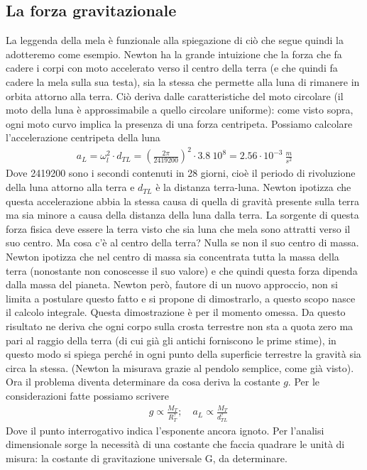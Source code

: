 \documentclass[10pt,a4paper]{article}
\begin{document}
\subsection{La forza gravitazionale}
La leggenda della mela è funzionale alla spiegazione di ciò che segue quindi la adotteremo come esempio. Newton ha la grande intuizione che la forza che fa cadere i corpi con moto accelerato verso il centro della terra (e che quindi fa cadere la mela sulla sua testa), sia la stessa che permette alla luna di rimanere in orbita attorno alla terra. Ciò deriva dalle caratteristiche del moto circolare (il moto della luna è approssimabile a quello circolare uniforme): come visto sopra, ogni moto curvo implica la presenza di una forza centripeta. Possiamo calcolare l'accelerazione centripeta della luna
\begin{align*}
	a_L = \omega_l^2 \cdot d_{TL} = (\frac{2 \pi}{2419200})^2 \cdot 3.8\ 10^{8}  = 2.56 \cdot10^{-3}\ \frac{m}{s^2}
\end{align*}
Dove 2419200 sono i secondi contenuti in 28 giorni, cioè il periodo di rivoluzione della luna attorno alla terra e $d_{TL}$ è la distanza terra-luna. Newton ipotizza che questa accelerazione abbia la stessa causa di quella di gravità presente sulla terra ma sia minore a causa della distanza della luna dalla terra. La sorgente di questa forza fisica deve essere la terra visto che sia luna che mela sono attratti verso il suo centro. Ma cosa c'è al centro della terra? Nulla se non il suo centro di massa. Newton ipotizza che nel centro di massa sia concentrata tutta la massa della terra (nonostante non conoscesse il suo valore) e che quindi questa forza dipenda dalla massa del pianeta. Newton però, fautore di un nuovo approccio, non si limita a postulare questo fatto e si propone di dimostrarlo, a questo scopo nasce il calcolo integrale. Questa dimostrazione è per il momento omessa. Da questo risultato ne deriva che ogni corpo sulla crosta terrestre non sta a quota zero ma pari al raggio della terra (di cui già gli antichi forniscono le prime stime), in questo modo si spiega perché in ogni punto della superficie terrestre la gravità sia circa la stessa. (Newton la misurava grazie al pendolo semplice, come già visto).\\
Ora il problema diventa determinare da cosa deriva la costante $g$. Per le considerazioni fatte possiamo scrivere
\begin{align*}
 &g \propto \frac{M_T}{R_T^?};\quad a_L \propto \frac{M_T}{d_{TL}^?}
\end{align*}
Dove il punto interrogativo indica l'esponente ancora ignoto. Per l'analisi dimensionale sorge la necessità di una costante che faccia quadrare le unità di misura: la costante di gravitazione universale G, da determinare. 
\end{document}
